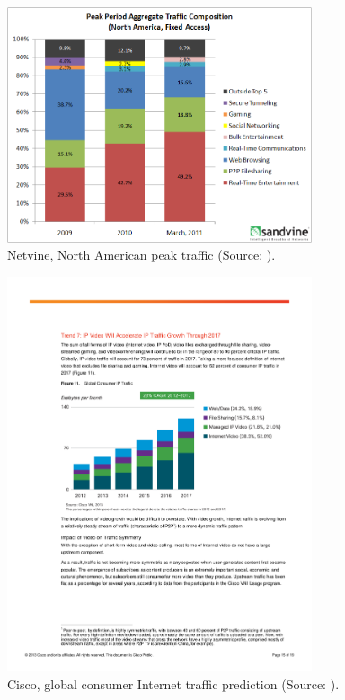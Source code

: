 \begin{figure}[htbp]
    \centering
    \includegraphics[width=0.8\textwidth]{images/netvine.png}
    \caption{Netvine, North American peak traffic (Source: \cite{sandvine_spring2011,sandvine_spring2013}).}
    \label{c1:fig:traffic_netvine}
\end{figure}

\begin{figure}[htbp]
    \centering
    \includegraphics[width=0.8\textwidth]{images/VNI_Hyperconnectivity_WP.pdf}
    \caption{Cisco, global consumer Internet traffic prediction (Source: \cite{cisco2013VNI}).}
    \label{c1:fig:traffic_cisco}
\end{figure}

